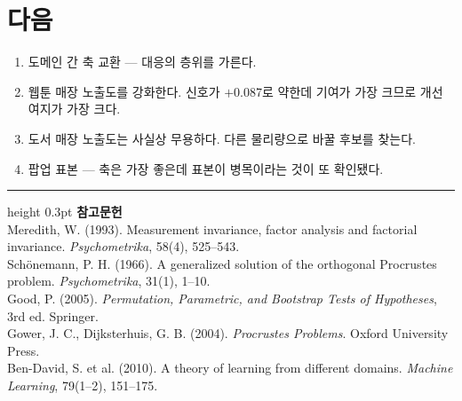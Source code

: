 \documentclass[10pt]{article}
\begin{document}
\section{다음}

\begin{enumerate}[leftmargin=1.3em,itemsep=0.15em]
\item 도메인 간 축 교환 --- 대응의 층위를 가른다.
\item 웹툰 매장 노출도를 강화한다. 신호가 $+$0.087로 약한데 기여가 가장 크므로
      개선 여지가 가장 크다.
\item 도서 매장 노출도는 사실상 무용하다. 다른 물리량으로 바꿀 후보를 찾는다.
\item 팝업 표본 --- 축은 가장 좋은데 표본이 병목이라는 것이 또 확인됐다.
\end{enumerate}

\vspace{0.6em}
\hrule height 0.3pt
\vspace{0.5em}
{\footnotesize
\textbf{참고문헌}\\[0.3em]
Meredith, W. (1993). Measurement invariance, factor analysis and factorial
invariance. \emph{Psychometrika}, 58(4), 525--543.\\[0.15em]
Schönemann, P. H. (1966). A generalized solution of the orthogonal Procrustes
problem. \emph{Psychometrika}, 31(1), 1--10.\\[0.15em]
Good, P. (2005). \emph{Permutation, Parametric, and Bootstrap Tests of
Hypotheses}, 3rd ed. Springer.\\[0.15em]
Gower, J. C., Dijksterhuis, G. B. (2004). \emph{Procrustes Problems}.
Oxford University Press.\\[0.15em]
Ben-David, S. et al. (2010). A theory of learning from different domains.
\emph{Machine Learning}, 79(1--2), 151--175.
}
\end{document}
